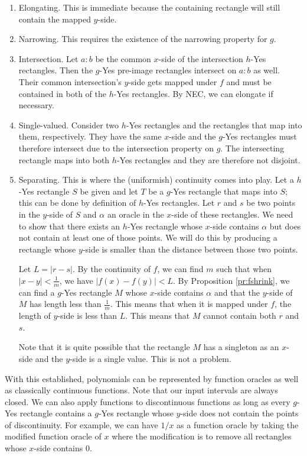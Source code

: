\documentclass[12pt]{article}
\theoremstyle{remark}
\begin{document}
\begin{enumerate} 
\item Elongating. This is immediate because the containing rectangle will still contain the mapped $y$-side. 
\item Narrowing. This requires the existence of the narrowing property for $g$. 
\item Intersection. Let $a:b$ be the common $x$-side of the intersection $h$-Yes rectangles. Then the $g$-Yes pre-image rectangles intersect on $a:b$ as well. Their common intersection's $y$-side gets mapped under $f$ and must be contained in both of the $h$-Yes rectangles. By NEC, we can elongate if necessary. 
\item Single-valued. Consider two $h$-Yes rectangles and the rectangles that map into them, respectively. They have the same $x$-side and the $g$-Yes rectangles must therefore intersect due to the intersection property on $g$. The intersecting rectangle maps into both $h$-Yes rectangles and they are therefore not disjoint.  

\item Separating. This is where the (uniformish) continuity comes into play. Let a $h$-Yes rectangle $S$ be given and let $T$ be a $g$-Yes rectangle that maps into $S$; this can be done by definition of $h$-Yes rectangles. Let $r$ and $s$ be two points in the $y$-side of $S$ and $\alpha$ an oracle in the $x$-side of these rectangles. We need to show that there exists an $h$-Yes rectangle whose $x$-side contains $\alpha$ but does not contain at least one of those points. We will do this by producing a rectangle whose $y$-side is smaller than the distance between those two points. 

Let $L = |r-s|$. By the continuity of $f$, we can find $m$ such that when $|x-y| < \frac{1}{m}$, we have $|f(x) - f(y)| < L$. By Proposition \ref{pr:fshrink}, we can find a $g$-Yes rectangle $M$ whose $x$-side contains $\alpha$ and that the $y$-side of $M$ has length less than $\frac{1}{m}$. This means that when it is mapped under $f$, the length of $y$-side is less than $L$. This means that $M$ cannot contain both $r$ and $s$.

Note that it is quite possible that the rectangle $M$ has a singleton as an $x$-side and the $y$-side is a single value. This is not a problem. 

\end{enumerate}

With this established, polynomials can be represented by function oracles as well as classically continuous functions. Note that our input intervals are always closed. We can also apply functions to discontinuous functions as long as every $g$-Yes rectangle contains a $g$-Yes rectangle whose $y$-side does not contain the points of discontinuity. For example, we can have $1/x$ as a function oracle by taking the modified function oracle of $x$ where the modification is to remove all rectangles whose $x$-side contains 0. 
\end{document}
